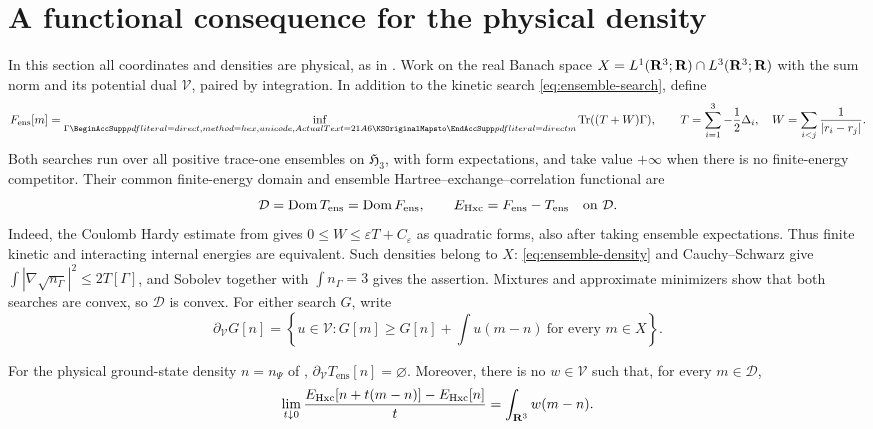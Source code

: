 \section{A functional consequence for the physical density}
\label{sec:hxc-first-variation}

In this section all coordinates and densities are physical, as in
.  Work on the real Banach space
$X=L^1(\mathbf R^3;\mathbf R)\cap L^3(\mathbf R^3;\mathbf R)$ with the sum norm and its potential
dual $\mathcal V$, paired by integration.  In addition to the kinetic
search \eqref{eq:ensemble-search}, define
\[
 F_{\mathrm{ens}}[m]
 =\inf_{\Gamma\mapsto m}\Tr((T+W)\Gamma),
 \qquad
 T=\sum_{i=1}^3-\frac12\Delta_i,
 \quad W=\sum_{i<j}\frac1{|r_i-r_j|}.
\]
Both searches run over all positive trace-one ensembles on
$\mathfrak H_3$, with form expectations, and take value $+\infty$ when
there is no finite-energy competitor.  Their common finite-energy
domain and ensemble Hartree--exchange--correlation functional are
\[
 \mathcal D=\operatorname{Dom} T_{\mathrm{ens}}=\operatorname{Dom} F_{\mathrm{ens}},
 \qquad
 E_{\mathrm{Hxc}}=F_{\mathrm{ens}}-T_{\mathrm{ens}}
 \quad\text{on }\mathcal D.
\]
Indeed, the Coulomb Hardy estimate from  gives
$0\le W\le\varepsilon T+C_\varepsilon$ as quadratic forms, also after
taking ensemble expectations.  Thus finite kinetic and interacting
internal energies are equivalent.  Such densities belong to $X$:
\eqref{eq:ensemble-density} and Cauchy--Schwarz give
$\int|\nabla\sqrt{n_\Gamma}|^2\le2T[\Gamma]$, and Sobolev together
with $\int n_\Gamma=3$ gives the assertion.  Mixtures and approximate
minimizers show that both searches are convex, so $\mathcal D$ is convex.
For either search $G$, write
\[
 \partial_{\mathcal V}G[n]
 =\left\{u\in\mathcal V:
 G[m]\ge G[n]+\int u(m-n)\ \text{for every }m\in X\right\}.
\]

\begin{corollary}
\label{cor:hxc-first-variation}
For the physical ground-state density $n=n_\Psi$ of ,
$\partial_{\mathcal V}T_{\mathrm{ens}}[n]=\varnothing$.
Moreover, there is no $w\in\mathcal V$ such that, for every
$m\in\mathcal D$,
\begin{equation}
 \lim_{t\downarrow0}
 \frac{E_{\mathrm{Hxc}}[n+t(m-n)]-E_{\mathrm{Hxc}}[n]}{t}
 =\int_{\mathbf R^3}w(m-n).
 \label{eq:hxc-full-segment-variation}
\end{equation}
\end{corollary}

